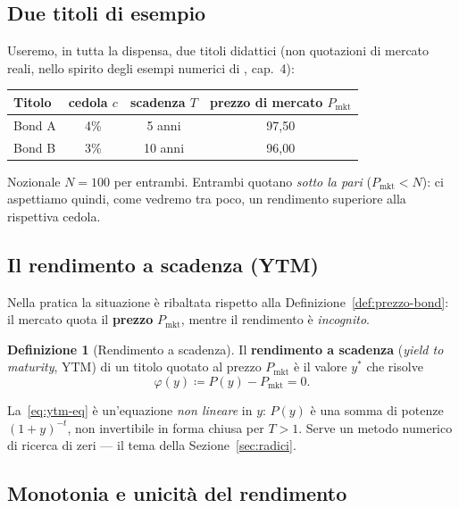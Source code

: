 \documentclass[11pt,a4paper]{article}
\theoremstyle{plain}
\theoremstyle{definition}
\newtheorem{definizione}[teorema]{Definizione}
\theoremstyle{remark}
\newcommand{\YTM}{\mathrm{YTM}}
\newcommand{\defeq}{\coloneqq}
\begin{document}
\subsection{Due titoli di esempio}
\label{sec:due-titoli}

Useremo, in tutta la dispensa, due titoli didattici (non quotazioni di mercato reali, nello
spirito degli esempi numerici di \cite{hull2018}, cap.~4):

\begin{center}
\renewcommand{\arraystretch}{1.3}
\begin{tabular}{lccc}
\toprule
Titolo & cedola $c$ & scadenza $T$ & prezzo di mercato $P_{\mathrm{mkt}}$ \\
\midrule
Bond A & 4\% & 5 anni & 97{,}50 \\
Bond B & 3\% & 10 anni & 96{,}00 \\
\bottomrule
\end{tabular}
\end{center}
Nozionale $N=100$ per entrambi. Entrambi quotano \emph{sotto la pari} ($P_{\mathrm{mkt}}<N$):
ci aspettiamo quindi, come vedremo tra poco, un rendimento superiore alla rispettiva cedola.

\subsection{Il rendimento a scadenza (YTM)}

Nella pratica la situazione è ribaltata rispetto alla Definizione~\ref{def:prezzo-bond}: il
mercato quota il \textbf{prezzo} $P_{\mathrm{mkt}}$, mentre il rendimento è \emph{incognito}.

\begin{definizione}[Rendimento a scadenza]
\label{def:ytm}
Il \textbf{rendimento a scadenza} (\emph{yield to maturity}, $\YTM$) di un titolo quotato al
prezzo $P_{\mathrm{mkt}}$ è il valore $y^\ast$ che risolve
\begin{equation}
  \varphi(y) \defeq P(y) - P_{\mathrm{mkt}} = 0.
  \label{eq:ytm-eq}
\end{equation}
\end{definizione}

La~\eqref{eq:ytm-eq} è un'equazione \emph{non lineare} in $y$: $P(y)$ è una somma di potenze
$(1+y)^{-t}$, non invertibile in forma chiusa per $T>1$. Serve un metodo numerico di ricerca
di zeri --- il tema della Sezione~\ref{sec:radici}.

\subsection{Monotonia e unicità del rendimento}
\end{document}
